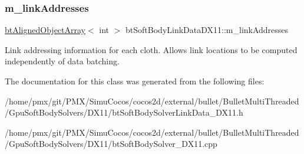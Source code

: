 \subsubsection{\texorpdfstring{m\+\_\+link\+Addresses}{m\_linkAddresses}}
{\footnotesize\ttfamily \hyperlink{classbtAlignedObjectArray}{bt\+Aligned\+Object\+Array}$<$ int $>$ bt\+Soft\+Body\+Link\+Data\+D\+X11\+::m\+\_\+link\+Addresses}

Link addressing information for each cloth. Allows link locations to be computed independently of data batching. 

The documentation for this class was generated from the following files\+:\begin{DoxyCompactItemize}
\item 
/home/pmx/git/\+P\+M\+X/\+Simu\+Cocos/cocos2d/external/bullet/\+Bullet\+Multi\+Threaded/\+Gpu\+Soft\+Body\+Solvers/\+D\+X11/bt\+Soft\+Body\+Solver\+Link\+Data\+\_\+\+D\+X11.\+h\item 
/home/pmx/git/\+P\+M\+X/\+Simu\+Cocos/cocos2d/external/bullet/\+Bullet\+Multi\+Threaded/\+Gpu\+Soft\+Body\+Solvers/\+D\+X11/bt\+Soft\+Body\+Solver\+\_\+\+D\+X11.\+cpp\end{DoxyCompactItemize}
